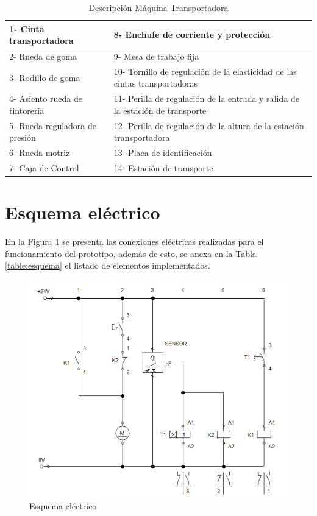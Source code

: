 \begin{table}[ht]
	\centering
	\begin{tabular}{|p{5cm}|p{8cm}|}
		\hline
		1- Cinta transportadora & 8- Enchufe de corriente y protección \\ 
		\hline
		2- Rueda de goma& 9- Mesa de trabajo fija\\
		\hline
		3- Rodillo de goma& 10- Tornillo de regulación de la elasticidad de las cintas transportadoras\\
		\hline
		4- Asiento rueda de tintorería& 11- Perilla de regulación de la entrada y salida de la estación de transporte\\
		\hline
		5- Rueda reguladora de presión& 12- Perilla de regulación de la altura de la estación transportadora\\
		\hline
		6- Rueda motriz& 13- Placa de identificación\\
		\hline
		7- Caja de Control& 14- Estación de transporte\\
		\hline
	\end{tabular}	
	\caption{Descripción Máquina Transportadora}
	\label{table:Banda}
\end{table}

\newpage
\section{Esquema eléctrico}
En la Figura \ref{fig:Esquema} se presenta las conexiones eléctricas realizadas para el funcionamiento del prototipo, además de esto, se anexa en la Tabla \ref{table:esquema} el listado de elementos implementados.  
\begin{figure}[ht]
	\centering
	\includegraphics[scale=0.5]{Figs/66.png}
	\caption{Esquema eléctrico}
	\label{fig:Esquema}
\end{figure}

